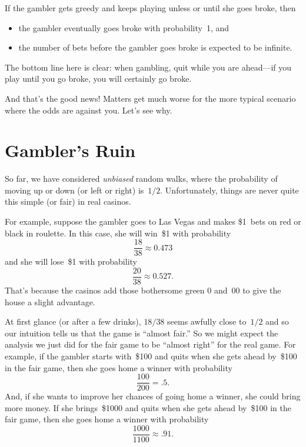 If the gambler gets greedy and keeps playing unless or until she goes
broke, then
\begin{itemize}

\item

the gambler eventually goes broke with probability~1, and

\item
the number of bets before the gambler goes broke is expected to be
infinite.

\end{itemize}

The bottom line here is clear: when gambling, quit while you are
ahead---if you play until you go broke, you will certainly go broke.

And that's the good news!  Matters get much worse for the more typical
scenario where the odds are against you.  Let's see why.

\section{Gambler's Ruin}

So far, we have considered \emph{unbiased} random walks, where the
probability of moving up or down (or left or right) is~$1/2$.
Unfortunately, things are never quite this simple (or fair) in real
casinos.

For example, suppose the gambler goes to Las Vegas and makes \$1~bets
on red or black in roulette.  In this case, she will win~\$1 with
probability
\begin{equation*}
    \frac{18}{38} \approx 0.473
\end{equation*}
and she will lose~\$1 with probability
\begin{equation*}
    \frac{20}{38} \approx 0.527.
\end{equation*}
That's because the casinos add those bothersome green 0 and~00 to give
the house a slight advantage.

At first glance (or after a few drinks), $18/38$ seems awfully close
to~$1/2$ and so our intuition tells us that the game is ``almost
fair.''  So we might expect the analysis we just did for the fair game
to be ``almost right'' for the real game.  For example, if the gambler
starts with~\$100 and quits when she gets ahead by~\$100 in the fair
game, then she goes home a winner with probability
\begin{equation*}
    \frac{100}{200} = .5.
\end{equation*}
And, if she wants to improve her chances of going home a winner, she
could bring more money.  If she brings~\$1000 and quits when she gets
ahead by~\$100 in the fair game, then she goes home a winner with
probability
\begin{equation*}
    \frac{1000}{1100} \approx .91.
\end{equation*}

